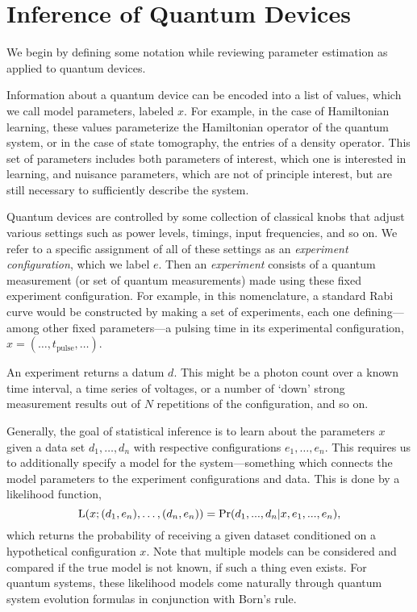 \documentclass[aps,prl,twocolumn,superscriptaddress]{revtex4}
\newcommand{\mps}{x}
\newcommand{\eps}{e}
\newcommand{\data}{d}
\begin{document}
\section{Inference of Quantum Devices}
\label{sec:inference}

We begin by defining some notation while reviewing parameter 
estimation as applied to quantum devices.

Information about a quantum device can be encoded into a list of 
values, which we call model parameters, labeled $\mps$.
For example, in the case of Hamiltonian learning, 
these values parameterize the Hamiltonian operator of the 
quantum system, or in the case of 
state tomography, the entries of a density operator.
This set of parameters includes both parameters of interest, which 
one is interested in learning, and nuisance parameters, which are
not of principle interest, but are still necessary to sufficiently 
describe the system.

Quantum devices are controlled by some collection of 
classical knobs that adjust various settings 
such as power levels, timings, input frequencies, and so on.
We refer to a specific assignment of all of these settings as an
\textit{experiment configuration}, which we label $\eps$.
Then an \textit{experiment}
consists of a quantum measurement (or set of quantum measurements) 
made using these fixed experiment configuration.
For example, in this nomenclature, a standard Rabi curve 
would be constructed by making a set of 
experiments, each one defining---among other fixed parameters---a 
pulsing time in its experimental configuration, 
$\mps=(\ldots,t_\text{pulse},\ldots)$.

An experiment returns a datum $\data$. 
This might be a photon count
over a known time interval, a time series of voltages, 
or a number of `down' strong measurement results out of $N$ repetitions
of the configuration, and so on.

Generally, the goal of statistical inference is to learn about the parameters
$\mps$ given a data set $\data_1,\ldots,\data_n$ with respective 
configurations $\eps_1,\ldots,\eps_n$.
This requires us to additionally specify a model for the 
system---something which connects the model parameters to the experiment 
configurations and data.
This is done by a likelihood function,
\begin{equation}
    \Lhood(\mps;(\data_1,\eps_n),\ldots,(\data_n,\eps_n))
        = \Pr(\data_1,...,\data_n|\mps,\eps_1,...,\eps_n),
\end{equation} 
which returns the probability of receiving a given dataset conditioned
on a hypothetical configuration $\mps$.
Note that multiple models can be considered and compared if the
true model is not known, if such a thing even exists.
For quantum systems, these likelihood models come naturally
through quantum system evolution formulas in conjunction 
with Born's rule.
\end{document}
